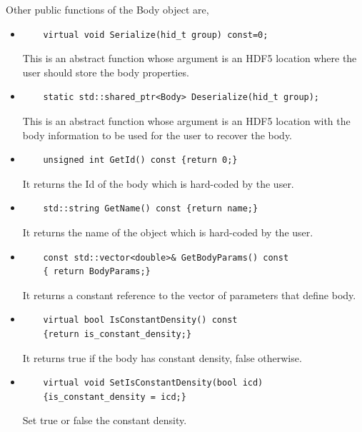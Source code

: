 \documentclass[3p,12pt]{elsarticle}
\newcommand{\ttf}{\ttfamily}
\begin{document}
Other public functions of the {\ttf Body} object are,

\begin{itemize}
\item  
  \begin{lstlisting}
    virtual void Serialize(hid_t group) const=0;
  \end{lstlisting}
  This is an abstract function whose argument is an HDF5 location
  where the user should store the body properties.

  \item  
  \begin{lstlisting}
    static std::shared_ptr<Body> Deserialize(hid_t group);
  \end{lstlisting}
  This is an abstract function whose argument is an HDF5 location
  with the body information to be used for the user to recover the body.
  
\item  
  \begin{lstlisting}
    unsigned int GetId() const {return 0;}
  \end{lstlisting}
  It returns the Id of the body which is hard-coded by the user.

\item  
  \begin{lstlisting}
    std::string GetName() const {return name;}
  \end{lstlisting}
  It returns the name of the object which is hard-coded by the user.

\item  
  \begin{lstlisting}
    const std::vector<double>& GetBodyParams() const
    { return BodyParams;}
  \end{lstlisting}
  It returns a constant reference to the vector of parameters that define body. 
  
  \item  
  \begin{lstlisting}
    virtual bool IsConstantDensity() const
    {return is_constant_density;}
  \end{lstlisting}
  It returns true if the body has constant density, false otherwise.
  
\item  
  \begin{lstlisting}
    virtual void SetIsConstantDensity(bool icd)
    {is_constant_density = icd;}
  \end{lstlisting}
  Set true or false the constant density. 
\end{itemize}
\end{document}
